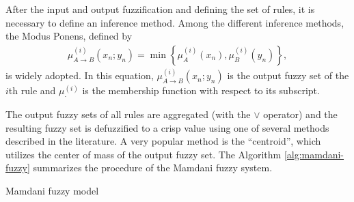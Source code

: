\documentclass[english]{sobraep}
\begin{document}
After the input and output fuzzification and defining the set of rules, it is necessary to define an inference method. Among the different inference methods, the Modus Ponens, defined by
\begin{align}
    \mu_{A\rightarrow B}^{(i)} (x_n;y_n) = \min\left\{  \mu_A^{(i)}(x_n), \mu_B^{(i)} (y_n) \right\},
\end{align}
is widely adopted. In this equation, \(\mu_{A\rightarrow B}^{(i)} (x_n;y_n)\) is the output fuzzy set of the \(i\)th rule and \(\mu_\cdot^{(i)}\) is the membership function with respect to its subscript.

The output fuzzy sets of all rules are aggregated (with the \(\vee\) operator) and the resulting fuzzy set is defuzzified to a crisp value using one of several methods described in the literature. A very popular method is the ``centroid'', which utilizes the center of mass of the output fuzzy set. The Algorithm \ref{alg:mamdani-fuzzy} summarizes the procedure of the Mamdani fuzzy system.

\begin{algorithm}[!ht]
    \DontPrintSemicolon
      
    
    \caption{Mamdani fuzzy model}
    \label{alg:mamdani-fuzzy}
\end{algorithm}
\end{document}
